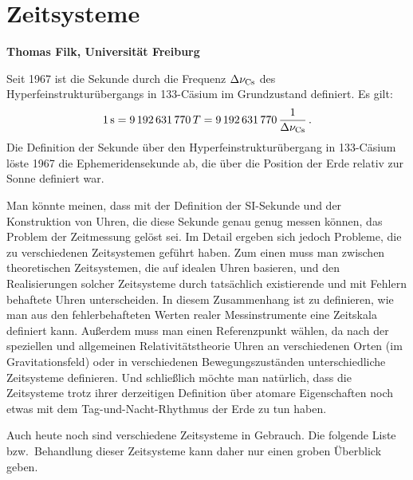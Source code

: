 
\setcounter{page}{1}
\setcounter{section}{0}
\setcounter{figure}{0}
\setcounter{equation}{0}
\setcounter{table}{0}
\setcounter{footnote}{0}

\section*{Zeitsysteme}
\vspace{0.2cm}
\noindent
{\bf Thomas Filk, Universit\"at Freiburg}
\vspace{1cm}

\label{chap_Zeitsysteme}
\noindent
Seit 1967 ist die Sekunde 
durch die Frequenz $\Delta \nu_{\rm Cs}$ des Hyperfeinstruktur\"ubergangs
in 133-C\"asium im Grundzustand definiert. Es gilt:
\begin{equation}
               1\,{\rm s}  =  9\,192\,631\,770 \, T = 9\,192\,631\,770 \, \frac{1}{\Delta \nu_{\rm Cs}} \, .
\end{equation}  
Die Definition der Sekunde \"uber den Hyperfeinstruktur\"ubergang in 133-C\"asium l\"oste 1967 die 
Ephemeridensekunde ab, die \"uber die Position der Erde relativ zur Sonne definiert war. 

Man k\"onnte meinen, dass mit der Definition der SI-Sekunde und der Konstruktion von
Uhren, die diese Sekunde genau genug messen k\"onnen, das Problem der Zeitmessung
gel\"ost sei. Im Detail ergeben sich jedoch Probleme, die zu verschiedenen
Zeitsystemen gef\"uhrt haben. Zum einen muss man zwischen theoretischen Zeitsystemen,
die auf idealen Uhren basieren, und den Realisierungen solcher Zeitsysteme durch
tats\"achlich existierende und mit Fehlern behaftete Uhren unterscheiden. In diesem Zusammenhang
ist zu definieren, wie man aus den fehlerbehafteten Werten realer Messinstrumente eine Zeitskala
definiert kann. Au\ss erdem muss
man einen Referenzpunkt w\"ahlen, da nach der speziellen und allgemeinen Relativit\"atstheorie
Uhren an verschiedenen Orten (im Gravitationsfeld) oder in verschiedenen Bewegungszust\"anden
unterschiedliche Zeitsysteme definieren. Und schlie\ss lich m\"ochte man nat\"urlich, dass die
Zeitsysteme trotz ihrer derzeitigen Definition \"uber atomare Eigenschaften noch etwas mit dem 
Tag-und-Nacht-Rhythmus der Erde zu tun haben.

Auch heute noch sind verschiedene Zeitsysteme in Gebrauch. Die folgende Liste bzw.\ Behandlung
dieser Zeitsysteme kann daher nur einen groben \"Uberblick geben. 

